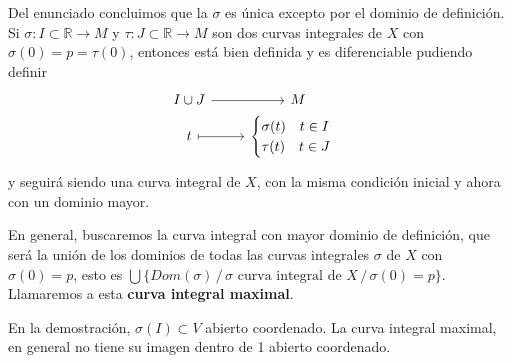 \begin{obs} Del enunciado concluimos que la $\sigma$ es \'unica excepto por el dominio de definici\'on. Si $\sigma: I\subset \mathbb{R} \to M$ y $\tau: J \subset \mathbb{R} \to M$ son dos curvas integrales de $X$ con $\sigma(0) = p = \tau(0)$, entonces está bien definida y es diferenciable pudiendo definir
$$\begin{tikzcd}
I \cup J \rar & M\\[-6mm]
t \arrow[mapsto]{r} & \begin{cases}
\sigma(t) \quad t\in I\\
\tau(t) \quad t \in J
\end{cases}
\end{tikzcd}$$
y seguirá siendo una curva integral de $X$, con la misma condición inicial y ahora con un dominio mayor.

En general, buscaremos la curva integral con mayor dominio de definición, que será la unión de los dominios de todas las curvas integrales $\sigma$ de $X$ con $\sigma(0) = p$, esto es $\displaystyle \bigcup \{Dom(\sigma) \, / \, \sigma \text{ curva integral de } X \, / \, \sigma(0)=p\}$. Llamaremos a esta\textbf{ curva integral maximal}.

En la demostraci\'on, $\sigma(I)\subset V$ abierto coordenado. La curva integral maximal, en general no tiene su imagen dentro de 1 abierto coordenado. 
\end{obs}
